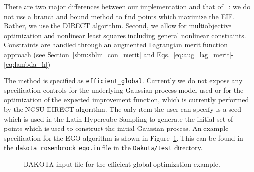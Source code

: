 There are two major differences between our implementation and that of
~\cite{Jon98}: we do not use a branch and bound method to find points
which maximize the EIF.  Rather, we use the DIRECT algorithm.  Second,
we allow for multiobjective optimization and nonlinear least squares
including general nonlinear constraints.  Constraints are handled
through an augmented Lagrangian merit function approach (see
Section~\ref{sbm:sblm_con_merit} and
Eqs.~\ref{eq:aug_lag_merit}-\ref{eq:lambda_h}).

The method is specified as \texttt{efficient\_global}.  Currently we
do not expose any specification controls for the underlying Gaussian
process model used or for the optimization of the expected improvement
function, which is currently performed by the NCSU DIRECT
algorithm. The only item the user can specify is a seed which is 
used in the Latin Hypercube Sampling to generate the initial 
set of points which is used to construct the initial Gaussian process. 
An example specification for the EGO algorithm is shown in
Figure~\ref{sbm:egm_rosen}.  This can be found in the 
\texttt{dakota\_rosenbrock\_ego.in} file in the 
\texttt{Dakota/test} directory.
\begin{figure}
  \begin{bigbox}
    \begin{small}
    \end{small}
  \end{bigbox}
  \caption{DAKOTA input file for the efficient global optimization example.}
  \label{sbm:egm_rosen}
\end{figure}

